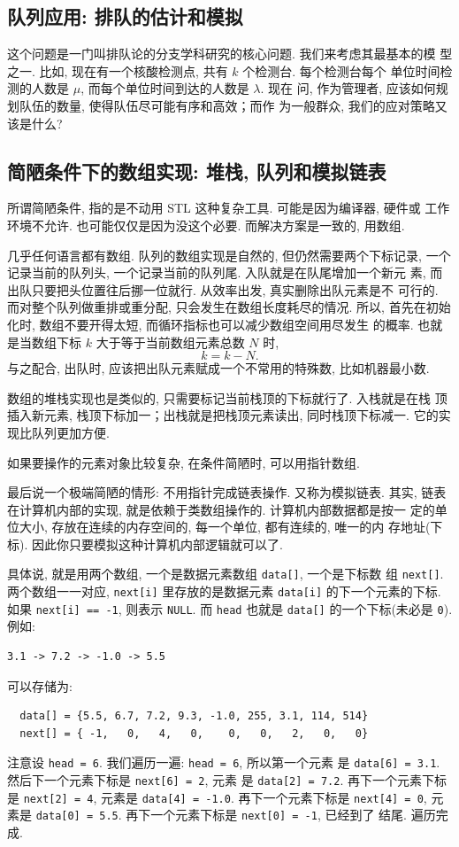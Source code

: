 \documentclass[a4paper]{ctexart}
\theoremstyle{definition}
\theoremstyle{definition}
\begin{document}
\subsection{队列应用: 排队的估计和模拟}

这个问题是一门叫排队论的分支学科研究的核心问题. 我们来考虑其最基本的模
型之一. 比如, 现在有一个核酸检测点, 共有 $k$ 个检测台. 每个检测台每个
单位时间检测的人数是 $\mu$, 而每个单位时间到达的人数是 $\lambda$. 现在
问, 作为管理者, 应该如何规划队伍的数量, 使得队伍尽可能有序和高效；而作
为一般群众, 我们的应对策略又该是什么? 

\subsection{简陋条件下的数组实现: 堆栈, 队列和模拟链表}

所谓简陋条件, 指的是不动用 STL 这种复杂工具. 可能是因为编译器, 硬件或
工作环境不允许. 也可能仅仅是因为没这个必要. 而解决方案是一致的, 用数组.

几乎任何语言都有数组. 队列的数组实现是自然的, 但仍然需要两个下标记录,
一个记录当前的队列头, 一个记录当前的队列尾. 入队就是在队尾增加一个新元
素, 而出队只要把头位置往后挪一位就行. 从效率出发, 真实删除出队元素是不
可行的. 而对整个队列做重排或重分配, 只会发生在数组长度耗尽的情况. 所以,
首先在初始化时, 数组不要开得太短, 而循环指标也可以减少数组空间用尽发生
的概率. 也就是当数组下标 $k$ 大于等于当前数组元素总数 $N$ 时,
$$
k = k - N.
$$
与之配合, 出队时, 应该把出队元素赋成一个不常用的特殊数, 比如机器最小数. 

数组的堆栈实现也是类似的, 只需要标记当前栈顶的下标就行了. 入栈就是在栈
顶插入新元素, 栈顶下标加一；出栈就是把栈顶元素读出, 同时栈顶下标减一.
它的实现比队列更加方便.

如果要操作的元素对象比较复杂, 在条件简陋时, 可以用指针数组.

最后说一个极端简陋的情形: 不用指针完成链表操作. 又称为模拟链表. 其实,
链表在计算机内部的实现, 就是依赖于类数组操作的. 计算机内部数据都是按一
定的单位大小, 存放在连续的内存空间的, 每一个单位, 都有连续的, 唯一的内
存地址(下标). 因此你只要模拟这种计算机内部逻辑就可以了.

具体说, 就是用两个数组, 一个是数据元素数组 \verb|data[]|, 一个是下标数
组 \verb|next[]|. 两个数组一一对应, \verb|next[i]| 里存放的是数据元素
\verb|data[i]| 的下一个元素的下标. 如果 \verb|next[i] == -1|, 则表示
\verb|NULL|. 而 \verb|head| 也就是 \verb|data[]| 的一个下标(未必是
\verb|0|).
例如:
\begin{verbatim}
3.1 -> 7.2 -> -1.0 -> 5.5 
\end{verbatim}
可以存储为:
\begin{verbatim}
  data[] = {5.5, 6.7, 7.2, 9.3, -1.0, 255, 3.1, 114, 514}
  next[] = { -1,   0,   4,   0,    0,   0,   2,   0,   0}
\end{verbatim}
注意设 \verb|head = 6|. 我们遍历一遍: \verb|head = 6|, 所以第一个元素
是 \verb|data[6] = 3.1|. 然后下一个元素下标是 \verb|next[6] = 2|, 元素
是 \verb|data[2] = 7.2|. 再下一个元素下标是 \verb|next[2] = 4|, 元素是
\verb|data[4] = -1.0|. 再下一个元素下标是 \verb|next[4] = 0|, 元素是
\verb|data[0] = 5.5|. 再下一个元素下标是 \verb|next[0] = -1|, 已经到了
结尾. 遍历完成. 
\end{document}
